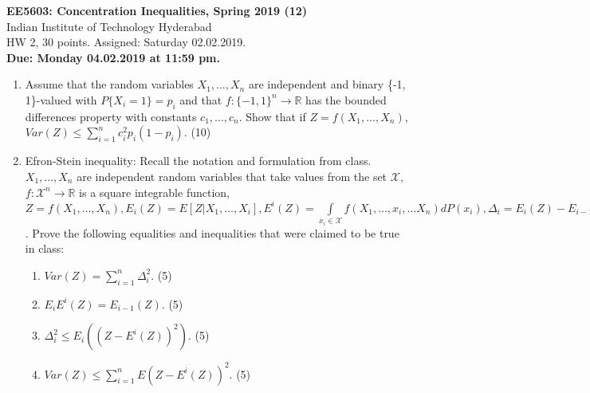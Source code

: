 \documentclass{article}
\begin{document}
\begin{center}
{\large{{\bf{EE5603: Concentration Inequalities, Spring 2019 (12)}\\}}}
Indian Institute of Technology Hyderabad\\
HW 2, 30 points. Assigned: Saturday 02.02.2019.\\
{\bf{Due: Monday 04.02.2019 at 11:59 pm.}} 
\end{center}
\begin{enumerate}
\item{
Assume that the random variables $X_1, \ldots, X_n$ are independent and binary \{-1, 1\}-valued with $P\{X_i = 1\} = p_i$ and that $f:\{-1, 1\}^n \longrightarrow \mathbb{R}$ has the bounded differences property with constants $c_1, \ldots, c_n$. Show that if $Z = f(X_1, \ldots, X_n)$, $Var(Z) \leq \sum\limits_{i=1}^nc_i^2p_i(1 - p_i)$. (10) 
}

    \item{Efron-Stein inequality: Recall the notation and formulation from class. $X_1, \ldots, X_n$ are independent random variables that take values from the set $\mathcal{X}$, $f: \mathcal{X}^n \longrightarrow \mathbb{R}$ is a square integrable function, $Z = f(X_1, \ldots, X_n), E_i(Z) = E[Z|X_1, \ldots, X_i], E^i(Z) = \int\limits_{x_i \in \mathcal{X}} f(X_1, \ldots, x_i, \ldots X_n) dP(x_i), \Delta_i = E_i(Z) - E_{i-1}(Z)$. Prove the following equalities and inequalities that were claimed to be true in class: 
        \begin{enumerate}
        \item{$Var(Z) = \sum\limits_{i=1}^n\Delta_i^2$. (5)}
        \item{$E_iE^i(Z) = E_{i-1}(Z)$. (5)}
        \item{$\Delta_i^2 \leq E_i((Z - E^i(Z))^2)$. (5)}
        \item{$Var(Z) \leq \sum\limits_{i=1}^n E(Z - E^i(Z))^2$. (5)}
        \end{enumerate}
        }
\end{enumerate}
\end{document}
